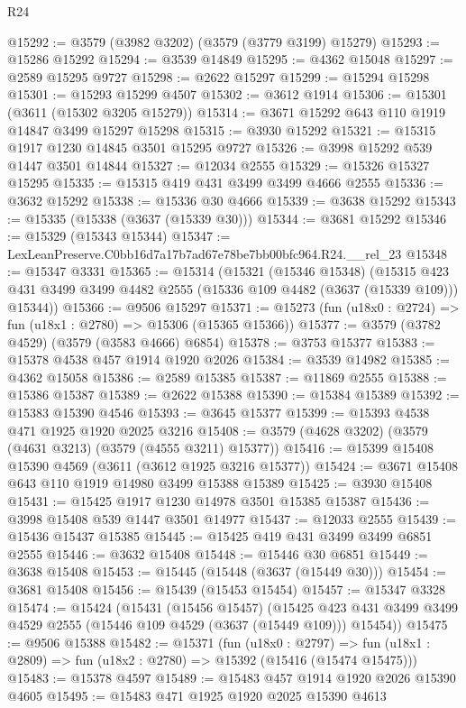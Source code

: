 \begin{lexlean}{R24}
\begin{coremodule}
@15292 := @3579 (@3982 @3202) (@3579 (@3779 @3199) @15279)
@15293 := @15286 @15292
@15294 := @3539 @14849
@15295 := @4362 @15048
@15297 := @2589 @15295 @9727
@15298 := @2622 @15297
@15299 := @15294 @15298
@15301 := @15293 @15299 @4507
@15302 := @3612 @1914
@15306 := @15301 (@3611 (@15302 @3205 @15279))
@15314 := @3671 @15292 @643 @110 @1919 @14847 @3499 @15297 @15298
@15315 := @3930 @15292
@15321 := @15315 @1917 @1230 @14845 @3501 @15295 @9727
@15326 := @3998 @15292 @539 @1447 @3501 @14844
@15327 := @12034 @2555
@15329 := @15326 @15327 @15295
@15335 := @15315 @419 @431 @3499 @3499 @4666 @2555
@15336 := @3632 @15292
@15338 := @15336 @30 @4666
@15339 := @3638 @15292
@15343 := @15335 (@15338 (@3637 (@15339 @30)))
@15344 := @3681 @15292
@15346 := @15329 (@15343 @15344)
@15347 := LexLeanPreserve.C0bb16d7a17b7ad67e78be7bb00bfc964.R24.__rel_23
@15348 := @15347 @3331
@15365 := @15314
    (@15321
      (@15346 @15348)
      (@15315 @423 @431 @3499 @3499 @4482 @2555 (@15336 @109 @4482 (@3637 (@15339 @109))) @15344))
@15366 := @9506 @15297
@15371 := @15273 (fun (u18x0 : @2724) => fun (u18x1 : @2780) => @15306 (@15365 @15366))
@15377 := @3579 (@3782 @4529) (@3579 (@3583 @4666) @6854)
@15378 := @3753 @15377
@15383 := @15378 @4538 @457 @1914 @1920 @2026
@15384 := @3539 @14982
@15385 := @4362 @15058
@15386 := @2589 @15385
@15387 := @11869 @2555
@15388 := @15386 @15387
@15389 := @2622 @15388
@15390 := @15384 @15389
@15392 := @15383 @15390 @4546
@15393 := @3645 @15377
@15399 := @15393 @4538 @471 @1925 @1920 @2025 @3216
@15408 := @3579 (@4628 @3202) (@3579 (@4631 @3213) (@3579 (@4555 @3211) @15377))
@15416 := @15399 @15408 @15390 @4569 (@3611 (@3612 @1925 @3216 @15377))
@15424 := @3671 @15408 @643 @110 @1919 @14980 @3499 @15388 @15389
@15425 := @3930 @15408
@15431 := @15425 @1917 @1230 @14978 @3501 @15385 @15387
@15436 := @3998 @15408 @539 @1447 @3501 @14977
@15437 := @12033 @2555
@15439 := @15436 @15437 @15385
@15445 := @15425 @419 @431 @3499 @3499 @6851 @2555
@15446 := @3632 @15408
@15448 := @15446 @30 @6851
@15449 := @3638 @15408
@15453 := @15445 (@15448 (@3637 (@15449 @30)))
@15454 := @3681 @15408
@15456 := @15439 (@15453 @15454)
@15457 := @15347 @3328
@15474 := @15424
    (@15431
      (@15456 @15457)
      (@15425 @423 @431 @3499 @3499 @4529 @2555 (@15446 @109 @4529 (@3637 (@15449 @109))) @15454))
@15475 := @9506 @15388
@15482 := @15371
    (fun (u18x0 : @2797) =>
    fun (u18x1 : @2809) => fun (u18x2 : @2780) => @15392 (@15416 (@15474 @15475)))
@15483 := @15378 @4597
@15489 := @15483 @457 @1914 @1920 @2026 @15390 @4605
@15495 := @15483 @471 @1925 @1920 @2025 @15390 @4613

\end{coremodule}
\end{lexlean}
